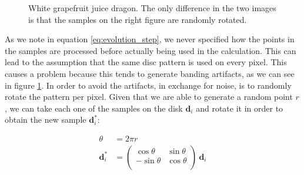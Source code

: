 \begin{figure}
\centering
{} 
\caption{White grapefruit juice dragon. The only difference in the two images is that the samples on the right figure are randomly rotated.}
\label{fig:banding}
\end{figure}

As we note in equation \ref{eq:evolution_step}, we never specified how the points in the samples are processed before actually being used in the calculation. This can lead to the assumption that the same disc pattern is used on every pixel. This causes a problem because this tends to generate banding artifacts, as we can see in figure \ref{fig:banding}. In order to avoid the artifacts, in exchange for noise, is to randomly rotate the pattern per pixel. Given that we are able to generate a random point $r$, we can take each one of the samples on the disk $\mathbf{d}_i$ and rotate it in order to obtain the new sample $\mathbf{d}_i^*$:

\renewcommand{\arraystretch}{1}
\begin{equation}
\begin{split}
\theta &= 2 \pi r \\
\mathbf{d}_i^* &= \left(\begin{array}{cc}
\cos\theta & \sin\theta \\
-\sin\theta & \cos\theta \\
\end{array} \right) \ \mathbf{d}_i
\end{split}
\label{eq:randomrot}
\end{equation}
\renewcommand{\arraystretch}{1.8}

